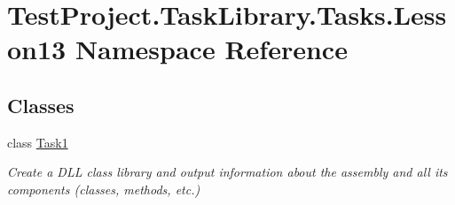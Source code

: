 \hypertarget{namespace_test_project_1_1_task_library_1_1_tasks_1_1_lesson13}{}\section{Test\+Project.\+Task\+Library.\+Tasks.\+Lesson13 Namespace Reference}
\label{namespace_test_project_1_1_task_library_1_1_tasks_1_1_lesson13}
\subsection*{Classes}
\begin{DoxyCompactItemize}
\item 
class \mbox{\hyperlink{class_test_project_1_1_task_library_1_1_tasks_1_1_lesson13_1_1_task1}{Task1}}
\begin{DoxyCompactList}\small\item\em Create a D\+LL class library and output information about the assembly and all its components (classes, methods, etc.) \end{DoxyCompactList}\end{DoxyCompactItemize}
